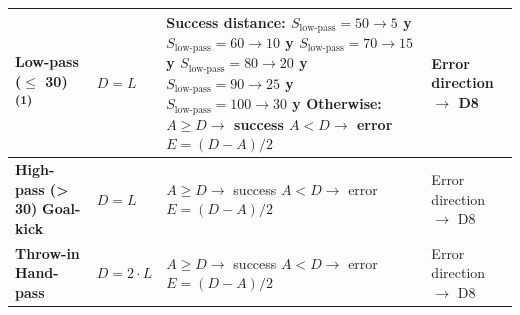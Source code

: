 \documentclass[12pt]{article}
\begin{document}
\begin{xltabular}{\textwidth}{>{\raggedright\arraybackslash}p{0.15\textwidth}>{\raggedright\arraybackslash}p{0.25\textwidth}>{\raggedright\arraybackslash}p{0.25\textwidth}>{\raggedright\arraybackslash}X}
\midrule
\textbf{Low-pass ($\leq$ 30)}\textsuperscript{(1)} & $D = L$ & \textbf{Success distance:} \newline $S_{\text{low-pass}} = 50 \rightarrow 5$ y \newline $S_{\text{low-pass}} = 60 \rightarrow 10$ y \newline $S_{\text{low-pass}} = 70 \rightarrow 15$ y \newline $S_{\text{low-pass}} = 80 \rightarrow 20$ y \newline $S_{\text{low-pass}} = 90 \rightarrow 25$ y \newline $S_{\text{low-pass}} = 100 \rightarrow 30$ y \newline \textbf{Otherwise:} \newline $A \geq D \rightarrow$ success \newline $A < D \rightarrow$ error \newline $E = (D - A)/2$ & Error direction $\rightarrow$ D8 \\
\midrule
\textbf{High-pass (> 30)} \newline \textbf{Goal-kick} & $D = L$ & $A \geq D \rightarrow$ success \newline $A < D \rightarrow$ error \newline $E = (D - A)/2$ & Error direction $\rightarrow$ D8 \\
\midrule
\textbf{Throw-in} \newline \textbf{Hand-pass} & $D = 2 \cdot L$ & $A \geq D \rightarrow$ success \newline $A < D \rightarrow$ error \newline $E = (D - A)/2$ & Error direction $\rightarrow$ D8 \\
\midrule

\end{xltabular}
\end{document}
